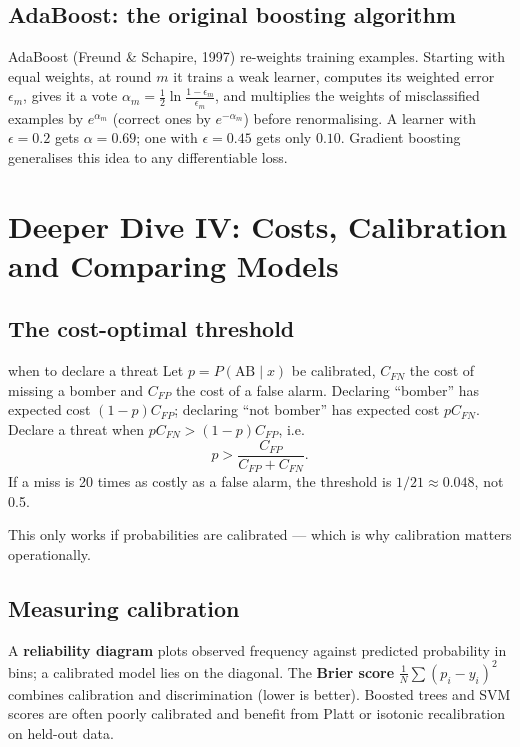 \documentclass[11pt]{article}
\begin{document}
\subsection{AdaBoost: the original boosting algorithm}
AdaBoost (Freund \& Schapire, 1997) re-weights training examples. Starting with equal weights, at round $m$ it trains a weak learner, computes its weighted error $\epsilon_m$, gives it a vote $\alpha_m=\tfrac12\ln\frac{1-\epsilon_m}{\epsilon_m}$, and multiplies the weights of misclassified examples by $e^{\alpha_m}$ (correct ones by $e^{-\alpha_m}$) before renormalising. A learner with $\epsilon=0.2$ gets $\alpha=0.69$; one with $\epsilon=0.45$ gets only $0.10$. Gradient boosting generalises this idea to any differentiable loss.

\section{Deeper Dive IV: Costs, Calibration and Comparing Models}
\subsection{The cost-optimal threshold}
\begin{derivation}{when to declare a threat}
Let $p=P(\text{AB}\mid x)$ be calibrated, $C_{FN}$ the cost of missing a bomber and $C_{FP}$ the cost of a false alarm. Declaring ``bomber'' has expected cost $(1-p)C_{FP}$; declaring ``not bomber'' has expected cost $pC_{FN}$. Declare a threat when $pC_{FN}>(1-p)C_{FP}$, i.e.
\[p>\frac{C_{FP}}{C_{FP}+C_{FN}}.\]
If a miss is 20 times as costly as a false alarm, the threshold is $1/21\approx0.048$, not 0.5.
\end{derivation}
This only works if probabilities are calibrated --- which is why calibration matters operationally.

\subsection{Measuring calibration}
A \textbf{reliability diagram} plots observed frequency against predicted probability in bins; a calibrated model lies on the diagonal. The \textbf{Brier score} $\frac1N\sum(p_i-y_i)^2$ combines calibration and discrimination (lower is better). Boosted trees and SVM scores are often poorly calibrated and benefit from Platt or isotonic recalibration on held-out data.
\end{document}
